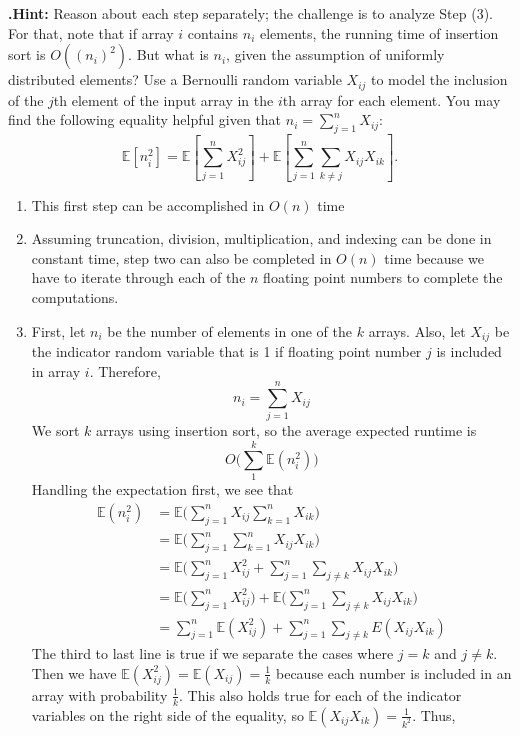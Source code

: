 \documentclass[12pt]{amsart}
\newenvironment{statement}[1]{\smallskip\noindent\color[rgb]{0.0,0.0,0.0} {\bf #1.}}{}
\theoremstyle{definition}
\theoremstyle{remark}
\newcommand{\E}{\mathbb{E}}
\newcommand{\1}{\mathds{1}}
\begin{document}
\begin{statement}{2}
\noindent\textbf{Hint:} Reason about each step separately; the challenge is to analyze Step (3). For that, note that if array $i$ contains $n_i$ elements, the running time of insertion sort is $O((n_i)^2)$. But what is $n_i$, given the assumption of uniformly distributed elements? Use a Bernoulli random variable $X_{ij}$ to model the inclusion of the $j$th element of the input array in the $i$th array for each element. You may find the following equality helpful given that $n_i = \sum_{j=1}^nX_{ij}$: $$\mathbb{E}\left[n_i^2\right] = \mathbb{E}\left[ \sum_{j=1}^{n}X_{ij}^2 \right] + \mathbb{E}\left[\sum_{j=1}^n\sum_{k\neq j} X_{ij}X_{ik} \right].$$
\begin{enumerate}
    \item This first step can be accomplished in $O(n)$ time
    \item Assuming truncation, division, multiplication, and indexing can be done in constant time, step two can also be completed in $O(n)$ time because we have to iterate 
    through each of the $n$ floating point numbers to complete the computations. 
    \item First, let $n_i$ be the number of elements in one of the $k$ arrays. Also, let $X_{ij}$ be the indicator random variable that is 
    1 if floating point number ${j}$ is included in array $i$. Therefore, 
    $$
        n_i = \sum_{j=1}^n X_{ij}
    $$
    We sort $k$ arrays using insertion sort, so the average expected runtime is 
    $$
        O\Big(\sum_{1}^k\E(n_i^2)\Big)
    $$
    Handling the expectation first, we see that
    \begin{align*}
        \E(n_i^2) &= \E\Big(\sum_{j=1}^nX_{ij} \sum_{k=1}^nX_{ik} \Big)\\
        &= \E\Big(\sum_{j=1}^n\sum_{k=1}^nX_{ij}X_{ik}\Big)\\ 
        &= \E\Big( \sum_{j=1}^n X_{ij}^2 + \sum_{j=1}^n\sum_{j\neq k} X_{ij}X_{ik} \Big)\\ 
        &= \E\Big(  \sum_{j=1}^n X_{ij}^2 \Big) + \E\Big( \sum_{j=1}^n\sum_{j\neq k} X_{ij}X_{ik} \Big)\\ 
        &= \sum_{j=1}^n\E(X_{ij}^2) + \sum_{j=1}^n\sum_{j\neq k}E(X_{ij}X_{ik})
    \end{align*}
    The third to last line is true if we separate the cases where $j=k$ and $j\neq k$. Then we have $\E(X_{ij}^2) = \E(X_{ij}) = \frac{1}{k}$ because 
    each number is included in an array with probability $\frac{1}{k}$. This also holds true for each of the indicator variables on the right side 
    of the equality, so $\E(X_{ij}X_{ik}) = \frac{1}{k^2}$. Thus, 

\end{enumerate}
\end{statement}
\end{document}
